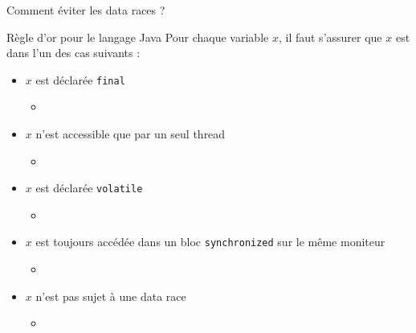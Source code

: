 
\begingroup

\begin{frame}[fragile]{Comment éviter les data races ?}

  \begin{block}{Règle d'or pour le langage Java}
    Pour chaque variable $x$, il faut s'assurer que $x$ est dans l'un des cas suivants : 
    \begin{itemize}
    \item $x$ est déclarée \lstinline{final}
      \begin{itemize}
      \item {}
      \end{itemize}
    \item $x$ n'est accessible que par un seul thread
      \begin{itemize}
      \item {}
      \end{itemize}
    \item $x$ est déclarée \lstinline{volatile}
      \begin{itemize}
      \item {}
      \end{itemize}
    \item $x$ est \alert{toujours} accédée dans un bloc \lstinline{synchronized} sur le même moniteur
      \begin{itemize}
      \item {}
      \end{itemize}
    \item $x$ n'est pas sujet à une data race
      \begin{itemize}
      \item {}
      \end{itemize}
    \end{itemize}
  \end{block}

\end{frame}

\endgroup
\endinput
